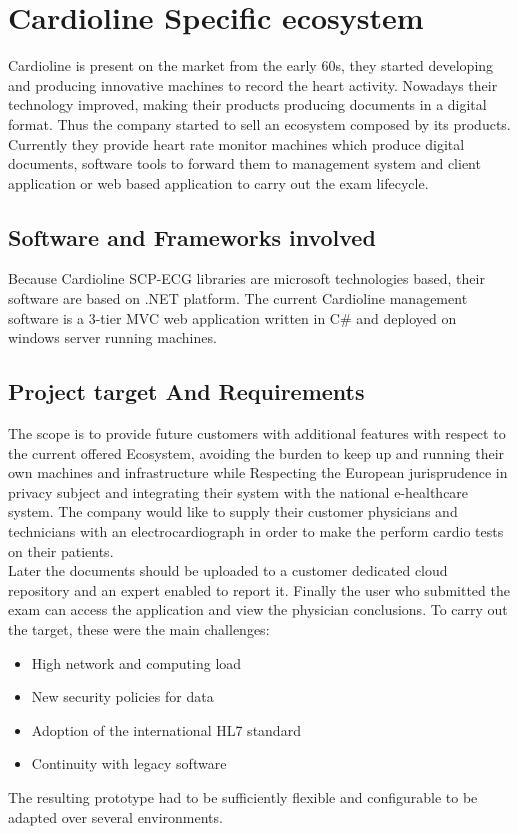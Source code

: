 \chapter{Cardioline Specific ecosystem}
\label{chapter:cardioline_specific_ecosystem}
Cardioline is present on the market from the early 60s, they started developing and producing innovative machines to record the heart activity. Nowadays their technology improved, making their products producing documents in a digital format.
Thus the company started to sell an ecosystem composed by its products. Currently they provide heart rate monitor machines which produce digital documents, software tools to forward them to management system and client application or web based application to carry out the exam lifecycle.

\section{Software and Frameworks involved}
Because Cardioline SCP-ECG libraries are microsoft technologies based, their software are based on .NET platform.
The current Cardioline management software is a 3-tier MVC web application written in C\# and deployed on windows server running machines.

\section{Project target And Requirements}
The scope is to provide future customers with additional features with respect to the current offered Ecosystem, avoiding the burden to keep up and running their own machines and infrastructure while Respecting the European jurisprudence in privacy subject and integrating their system with the national e-healthcare system. The company would like to supply their customer physicians and technicians with an electrocardiograph in order to make the perform cardio tests on their patients.\\
Later the documents should be uploaded to a customer dedicated cloud repository and an expert enabled to report it. Finally the user who submitted the exam can access the application and view the physician conclusions.
To carry out the target, these were the main challenges:
\begin{itemize}
    \item High network and computing load
    \item New security policies for data
    \item Adoption of the international HL7 standard
    \item Continuity with legacy software
\end{itemize}
The resulting prototype had to be sufficiently flexible and configurable to be adapted over several environments.

